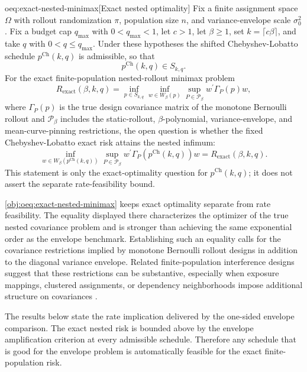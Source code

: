 \documentclass[11pt]{article}
\begin{document}
\begin{remarkv}{oeq:exact-nested-minimax}[Exact nested optimality]
Fix a finite assignment space \(\Omega\) with rollout randomization \(\pi\), population size \(n\), and variance-envelope scale \(\sigma_0^2\). Fix a budget cap \(q_{\max}\) with \(0<q_{\max}<1\), let \(c>1\), let \(\beta\ge 1\), set \(k=\lceil c\beta\rceil\), and take \(q\) with \(0<q\le q_{\max}\). Under these hypotheses the shifted Chebyshev-Lobatto schedule \(p^{\mathrm{Ch}}(k,q)\) is admissible, so that
\[
p^{\mathrm{Ch}}(k,q)\in S_{k,q}.
\]
For the exact finite-population nested-rollout minimax problem
\[
R_{\mathrm{exact}}(\beta,k,q)
=
\inf_{p\in S_{k,q}}
\inf_{w\in W_\beta(p)}
\sup_{P\in\mathcal P_\beta}
w^\prime \Gamma_P(p) w,
\]
where \(\Gamma_P(p)\) is the true design covariance matrix of the monotone Bernoulli rollout and \(\mathcal P_\beta\) includes the static-rollout, \(\beta\)-polynomial, variance-envelope, and mean-curve-pinning restrictions, the open question is whether the fixed Chebyshev-Lobatto exact risk attains the nested infimum:
\[
\inf_{w\in W_\beta(p^{\mathrm{Ch}}(k,q))}
\sup_{P\in\mathcal P_\beta}
w^\prime \Gamma_P(p^{\mathrm{Ch}}(k,q)) w
=
R_{\mathrm{exact}}(\beta,k,q).
\]
This statement is only the exact-optimality question for \(p^{\mathrm{Ch}}(k,q)\); it does not assert the separate rate-feasibility bound.
\end{remarkv}

\cref{obj:oeq:exact-nested-minimax} keeps exact optimality separate from rate feasibility. The equality displayed there characterizes the optimizer of the true nested covariance problem and is stronger than achieving the same exponential order as the envelope benchmark. Establishing such an equality calls for the covariance restrictions implied by monotone Bernoulli rollout designs in addition to the diagonal variance envelope. Related finite-population interference designs suggest that these restrictions can be substantive, especially when exposure mappings, clustered assignments, or dependency neighborhoods impose additional structure on covariances \citep{cortezrodriguez2024,eichhorn2024,jiang2023,cai2023}.

The results below state the rate implication delivered by the one-sided envelope comparison. The exact nested risk is bounded above by the envelope amplification criterion at every admissible schedule. Therefore any schedule that is good for the envelope problem is automatically feasible for the exact finite-population risk.
\end{document}
